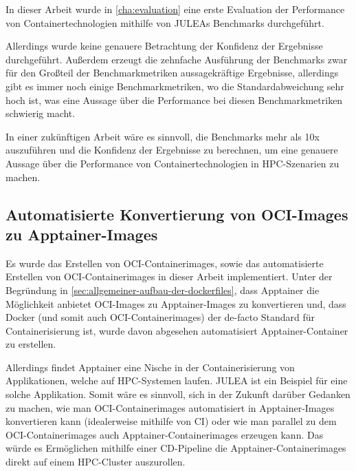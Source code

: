 In dieser Arbeit wurde in \cref{cha:evaluation} eine erste Evaluation der Performance von Containertechnologien mithilfe von JULEAs Benchmarks durchgeführt. 

Allerdings wurde keine genauere Betrachtung der Konfidenz der Ergebnisse durchgeführt. Außerdem erzeugt die zehnfache Ausführung der Benchmarks zwar für den Großteil der Benchmarkmetriken aussagekräftige Ergebnisse, allerdings gibt es immer noch einige Benchmarkmetriken, wo die Standardabweichung sehr hoch ist, was eine Aussage über die Performance bei diesen Benchmarkmetriken schwierig macht.

In einer zukünftigen Arbeit wäre es sinnvoll, die Benchmarks mehr als 10x auszuführen und die Konfidenz der Ergebnisse zu berechnen, um eine genauere Aussage über die Performance von Containertechnologien in HPC-Szenarien zu machen.

\subsection{Automatisierte Konvertierung von OCI-Images zu Apptainer-Images}

Es wurde das Erstellen von OCI-Containerimages, sowie das automatisierte Erstellen von OCI-Containerimages in dieser Arbeit implementiert. Unter der Begründung in \cref{sec:allgemeiner-aufbau-der-dockerfiles}, dass Apptainer die Möglichkeit anbietet OCI-Images zu Apptainer-Images zu konvertieren und, dass Docker (und somit auch OCI-Containerimages) der de-facto Standard für Containerisierung ist, wurde davon abgesehen automatisiert Apptainer-Container zu erstellen.

Allerdings findet Apptainer eine Nische in der Containerisierung von Applikationen, welche auf HPC-Systemen laufen. JULEA ist ein Beispiel für eine solche Applikation. Somit wäre es sinnvoll, sich in der Zukunft darüber Gedanken zu machen, wie man OCI-Containerimages automatisiert in Apptainer-Images konvertieren kann (idealerweise mithilfe von CI) oder wie man parallel zu dem OCI-Containerimages auch Apptainer-Containerimages erzeugen kann. Das würde es Ermöglichen mithilfe einer CD-Pipeline die Apptainer-Containerimages direkt auf einem HPC-Cluster auszurollen. 



